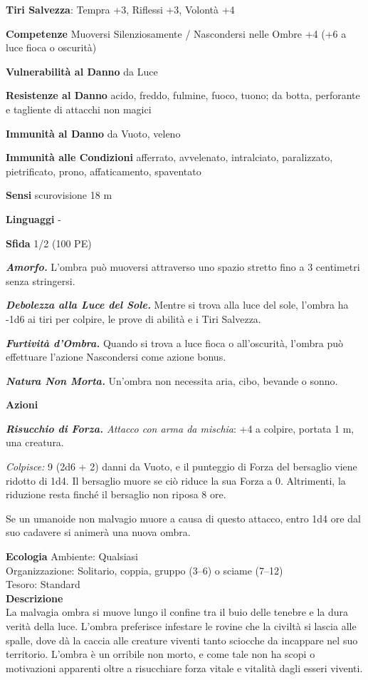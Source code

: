 \begin{multicols}{2}
\textbf{Tiri Salvezza}: Tempra +3, Riflessi +3, Volontà +4

\textbf{Competenze} Muoversi Silenziosamente / Nascondersi nelle Ombre +4 (+6 a luce fioca o oscurità)

\textbf{Vulnerabilità al Danno} da Luce

\textbf{Resistenze al Danno} acido, freddo, fulmine, fuoco, tuono; da botta, perforante e tagliente di attacchi non magici

\textbf{Immunità al Danno} da Vuoto, veleno

\textbf{Immunità alle Condizioni} afferrato, avvelenato, intralciato, paralizzato, pietrificato, prono, affaticamento, spaventato

\textbf{Sensi} scurovisione 18 m

\textbf{Linguaggi} -

\textbf{Sfida} 1/2 (100 PE)

\emph{\textbf{Amorfo.}} L'ombra può muoversi attraverso uno spazio stretto fino a 3 centimetri senza stringersi.

\emph{\textbf{Debolezza alla Luce del Sole.}} Mentre si trova alla luce del sole, l'ombra ha -1d6 ai tiri per colpire, le prove di abilità e i Tiri Salvezza.

\emph{\textbf{Furtività d'Ombra.}} Quando si trova a luce fioca o all'oscurità, l'ombra può effettuare l'azione Nascondersi come azione bonus. 

\emph{\textbf{Natura Non Morta.}} Un'ombra non necessita aria, cibo, bevande o sonno.

\textbf{Azioni}

\emph{\textbf{Risucchio di Forza.} Attacco con arma da mischia}: +4 a colpire, portata 1 m, una creatura.

\emph{Colpisce:} 9 (2d6 + 2) danni da Vuoto, e il punteggio di Forza del bersaglio viene ridotto di 1d4. Il bersaglio muore se ciò riduce la sua Forza a 0. Altrimenti, la riduzione resta finché il bersaglio non riposa 8 ore.

Se un umanoide non malvagio muore a causa di questo attacco, entro 1d4 ore dal suo cadavere si animerà una nuova ombra.

\textbf{Ecologia}
Ambiente: Qualsiasi\\
Organizzazione: Solitario, coppia, gruppo (3–6) o sciame (7–12)\\
Tesoro: Standard\\

\textbf{Descrizione}\\
La malvagia ombra si muove lungo il confine tra il buio delle tenebre e la dura verità della luce. L’ombra preferisce infestare le rovine che la civiltà si lascia alle spalle, dove dà la caccia alle creature viventi tanto sciocche da incappare nel suo territorio. L’ombra è un orribile non morto, e come tale non ha scopi o motivazioni apparenti oltre a risucchiare forza vitale e vitalità dagli esseri viventi.



\end{multicols}

